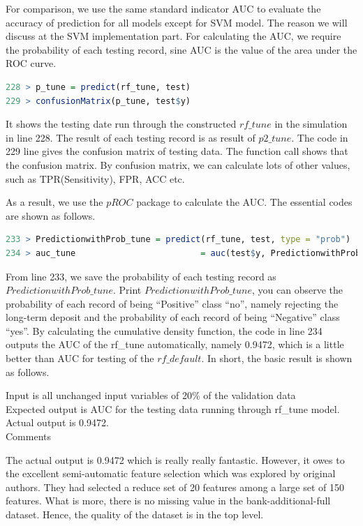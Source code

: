 \documentclass[12pt, a4paper, bibliography=totoc, english]{scrartcl}
\begin{document}
For comparison, we use the same standard indicator AUC to evaluate the accuracy of prediction for all models except for SVM model. The reason we will discuss at the SVM implementation part. For calculating the AUC, we require the probability of each testing record, sine AUC is the value of the area under the ROC curve.

\begin{lstlisting}[language = R]
228 > p_tune = predict(rf_tune, test)
229 > confusionMatrix(p_tune, test$y)
\end{lstlisting}
It shows the testing date run through the constructed $rf\_tune$ in the simulation in line 228. The result of each testing record is as result of $p2\_tune$. The code in 229 line gives the confusion matrix of testing data. The function call shows that the confusion matrix. By confusion matrix, we can calculate lots of other values, such as TPR(Sensitivity), FPR, ACC etc. 

As a result, we use the $pROC$ package to calculate the AUC. The essential codes are shown as follows.


\begin{lstlisting}[language = R]
233 > PredictionwithProb_tune = predict(rf_tune, test, type = "prob")
234 > auc_tune                         = auc(test$y, PredictionwithProb_tune[, 2])
\end{lstlisting}
From line 233, we save the probability of each testing record as $PredictionwithProb\_tune$. Print $PredictionwithProb\_tune$, you can observe the probability of each record of being ``Positive'' class ``no'', namely rejecting the long-term deposit and the probability of each record of being ``Negative'' class ``yes''. By calculating the cumulative density function, the code in line 234 outputs the AUC of the rf\_tune automatically, namely 0.9472, which is a little better than AUC for testing of the $rf\_default$.
In short, the basic result is shown as follows.

\textbullet\quad Input is all unchanged input variables of 20\% of the validation data\\
\textbullet\quad Expected output is AUC for the testing data running through rf\_tune model.\\
\textbullet\quad Actual output is 0.9472.\\
\textbullet\quad Comments 

The actual output is 0.9472 which is really really fantastic. However, it owes to the excellent semi-automatic feature selection which was explored by original authors.  They had selected a reduce set of 20 features among a large set of 150 features. What is more, there is no missing value in the bank-additional-full dataset. Hence, the quality of the dataset is in the top level. 
\end{document}
